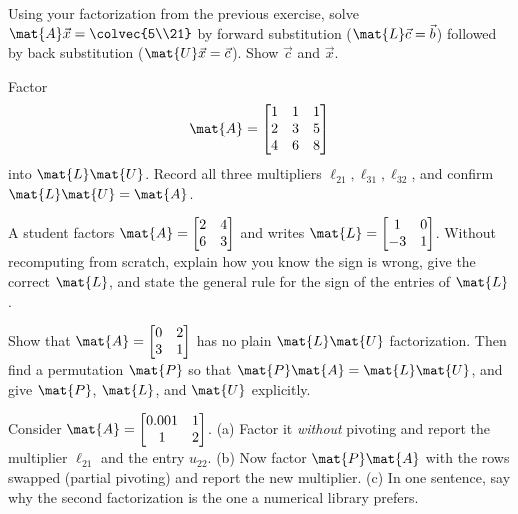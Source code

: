 \begin{exercise}
\label{ch09:ex-twoslides}
Using your factorization from the previous exercise, solve $\mat{A}\vec{x}=\colvec{5\\21}$ by
forward substitution ($\mat{L}\vec{c}=\vec{b}$) followed by back substitution
($\mat{U}\vec{x}=\vec{c}$). Show $\vec{c}$ and $\vec{x}$.
\end{exercise}

\begin{exercise}
\label{ch09:ex-3x3}
Factor
\[
  \mat{A} = \begin{bmatrix} 1 & 1 & 1 \\ 2 & 3 & 5 \\ 4 & 6 & 8 \end{bmatrix}
\]
into $\mat{L}\mat{U}$. Record all three multipliers $\ell_{21},\ell_{31},\ell_{32}$, and
confirm $\mat{L}\mat{U}=\mat{A}$.
\end{exercise}

\begin{exercise}
\label{ch09:ex-signs}
A student factors $\mat{A}=\begin{bmatrix}2&4\\6&3\end{bmatrix}$ and writes
$\mat{L}=\begin{bmatrix}1&0\\-3&1\end{bmatrix}$. Without recomputing from scratch, explain
how you know the sign is wrong, give the correct $\mat{L}$, and state the general rule for the
sign of the entries of $\mat{L}$.
\end{exercise}

\begin{exercise}
\label{ch09:ex-perm}
Show that $\mat{A}=\begin{bmatrix} 0 & 2 \\ 3 & 1 \end{bmatrix}$ has no plain $\mat{L}\mat{U}$
factorization. Then find a permutation $\mat{P}$ so that $\mat{P}\mat{A}=\mat{L}\mat{U}$, and
give $\mat{P}$, $\mat{L}$, and $\mat{U}$ explicitly.
\end{exercise}

\begin{exercise}
\label{ch09:ex-pivot-stability}
Consider $\mat{A}=\begin{bmatrix} 0.001 & 1 \\ 1 & 2 \end{bmatrix}$. (a) Factor it
\emph{without} pivoting and report the multiplier $\ell_{21}$ and the entry $u_{22}$.
(b) Now factor $\mat{P}\mat{A}$ with the rows swapped (partial pivoting) and report the new
multiplier. (c) In one sentence, say why the second factorization is the one a numerical
library prefers.
\end{exercise}

